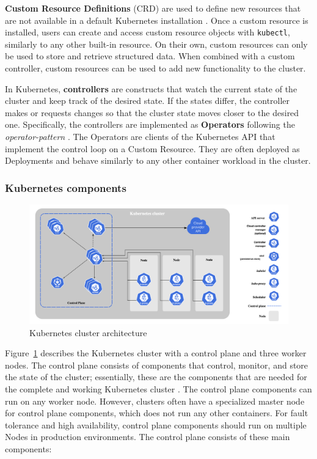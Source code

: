 \documentclass[english, 12pt, a4paper, sci, utf8, a-2b, online]{aaltothesis}
\begin{document}
\textbf{Custom Resource Definitions} (CRD) are used to define new resources that are not available in a default Kubernetes installation \cite{k8s-docs-crd}.
Once a custom resource is installed, users can create and access custom resource objects with \lstinline{kubectl}, similarly to any other built-in resource.
On their own, custom resources can only be used to store and retrieve structured data.
When combined with a custom controller, custom resources can be used to add new functionality to the cluster.

In Kubernetes, \textbf{controllers} are constructs that watch the current state of the cluster and keep track of the desired state.
If the states differ, the controller makes or requests changes so that the cluster state moves closer to the desired one.
Specifically, the controllers are implemented as \textbf{Operators} following the \emph{operator-pattern} \cite{k8s-docs-operators}.
The Operators are clients of the Kubernetes API that implement the control loop on a Custom Resource.
They are often deployed as Deployments and behave similarly to any other container workload in the cluster.

\subsubsection{Kubernetes components} \label{control-plane}

\begin{figure}[h!]
  \centering
  \includegraphics[width=\linewidth]{files/k8s-arch.png}
  \caption{Kubernetes cluster architecture \cite{k8s-docs-control-plane}}
  \label{figure-2}
\end{figure}

Figure~\ref{figure-2} describes the Kubernetes cluster with a control plane and three worker nodes.
The control plane consists of components that control, monitor, and store the state of the cluster; essentially, these are the components that are needed for the complete and working Kubernetes cluster \cite{k8s-docs-control-plane}.
The control plane components can run on any worker node.
However, clusters often have a specialized master node for control plane components, which does not run any other containers.
For fault tolerance and high availability, control plane components should run on multiple Nodes in production environments.
The control plane consists of these main components:
\end{document}
